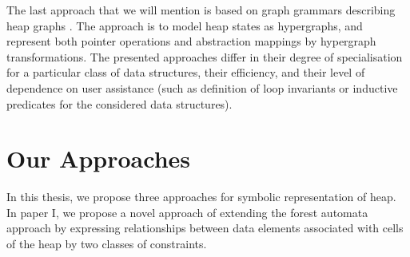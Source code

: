 The last approach that we will mention is based on graph grammars describing heap graphs \cite{Jonathan:Shape, Jonathan:Grammars}.  The approach is to model heap states as hypergraphs, and represent both pointer operations and abstraction mappings by hypergraph transformations. The presented approaches differ in their degree of specialisation for a particular class of data structures, their efficiency, and their level of dependence on user assistance (such as definition of loop invariants or inductive predicates for the considered data structures).
  
\section{Our Approaches}
In this thesis, we propose three approaches for symbolic representation of heap. In paper I, we propose a novel approach of extending the forest automata approach \cite{foresterfull} by expressing relationships between data elements associated with cells of the heap %
by two classes of constraints.


